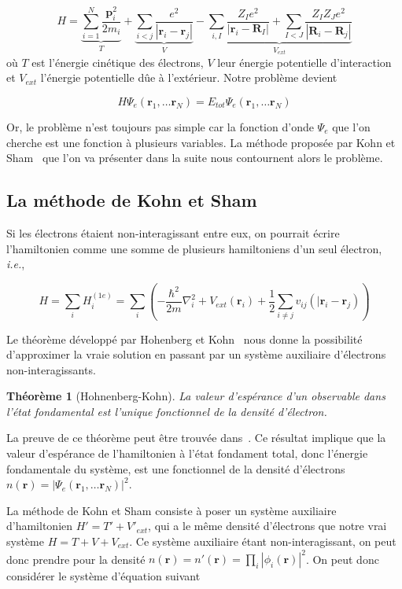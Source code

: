 \documentclass[12pt, french]{report}
\theoremstyle{theoreme}
\newtheorem{theoreme}{Théorème}
\begin{document}
$$
H = \underbrace{\sum_{i=1}^N \frac{\textbf{p}_i^2}{2m_i}}_{T}
+ \underbrace{\sum_{i<j}\frac{e^2}{| \textbf{r}_i - \textbf{r}_j |}}_{V}
- \underbrace{\sum_{i, I}\frac{Z_I e^2}{| \textbf{r}_i - \textbf{R}_I |} + \sum_{I<J}\frac{Z_I Z_J e^2}{| \textbf{R}_i - \textbf{R}_j |}}_{V_{ext}}
$$
où $T$ est l'énergie cinétique des électrons, $V$ leur énergie potentielle d'interaction et $V_{ext}$ l'énergie potentielle dûe à l'extérieur.
Notre problème devient

$$
H \Psi_e(\textbf{r}_1, \ldots \textbf{r}_N) = E_{tot} \Psi_e(\textbf{r}_1, \ldots \textbf{r}_N)
$$

Or, le problème n'est toujours pas simple car la fonction d'onde $\Psi_e$ que l'on cherche est une fonction à plusieurs variables. La méthode proposée par Kohn et Sham~\cite{Koh65} que l'on va présenter dans la suite nous contournent alors le problème.

\subsection{La méthode de Kohn et Sham}
Si les électrons étaient non-interagissant entre eux, on pourrait écrire l'hamiltonien comme une somme de plusieurs hamiltoniens d'un seul électron, \textit{i.e.},

$$
H = \sum_i H_i^{(1e)} = \sum_i (-\frac{\hbar^2}{2m}\nabla_i^2 + V_{ext}(\textbf{r}_i) + \frac{1}{2}\sum_{i \neq j} v_{ij}(|\textbf{r}_i - \textbf{r}_j))
$$

Le théorème développé par Hohenberg et Kohn~\cite{Hoh64} nous donne la possibilité d'approximer la vraie solution en passant par un système auxiliaire d'électrons non-interagissants.

\begin{theoreme}[Hohnenberg-Kohn]
  La valeur d'espérance d'un observable dans l'état fondamental est l'unique fonctionnel de la densité d'électron.
\end{theoreme}

La preuve de ce théorème peut être trouvée dans~\cite{Sot03}.
Ce résultat implique que la valeur d'espérance de l'hamiltonien à l'état fondament total, donc l'énergie fondamentale du système, est une fonctionnel de la densité d'électrons $n(\textbf{r}) = |\Psi_e(\textbf{r}_1, \ldots \textbf{r}_N) |^2$.

La méthode de Kohn et Sham consiste à poser un système auxiliaire d'hamiltonien $H' = T' + V'_{ext}$, qui a le même densité d'électrons que notre vrai système $H = T + V + V_{ext}$. Ce système auxiliaire étant non-interagissant, on peut donc prendre pour la densité $n(\textbf{r}) = n'(\textbf{r}) = \prod_i |\phi_i(\textbf{r})|^2$. On peut donc considérer le système d'équation suivant
\end{document}
